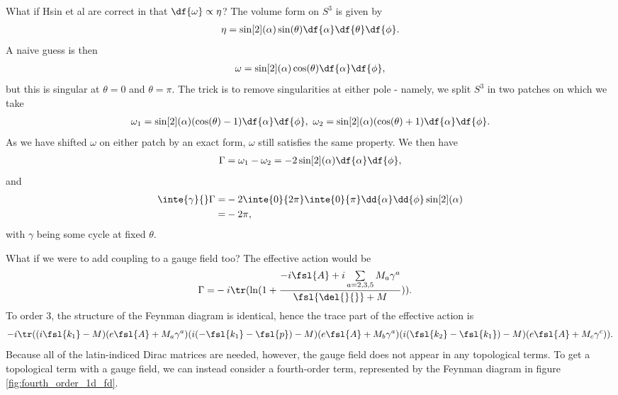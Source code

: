 What if Hsin et al are correct in that $\df{\omega} \propto \eta$? The volume form on $S^{3}$ is given by
\begin{align*}
	\eta = \sin[2](\alpha)\sin(\theta)\df{\alpha}\df{\theta}\df{\phi}.
\end{align*}
A naive guess is then
\begin{align*}
	\omega = \sin[2](\alpha)\cos(\theta)\df{\alpha}\df{\phi},
\end{align*}
but this is singular at $\theta = 0$ and $\theta = \pi$. The trick is to remove singularities at either pole - namely, we split $S^{3}$ in two patches on which we take
\begin{align*}
	\omega_{1} = \sin[2](\alpha)(\cos(\theta) - 1)\df{\alpha}\df{\phi},\ \omega_{2} = \sin[2](\alpha)(\cos(\theta) + 1)\df{\alpha}\df{\phi}.
\end{align*}
As we have shifted $\omega$ on either patch by an exact form, $\omega$ still satisfies the same property. We then have
\begin{align*}
	\Gamma = \omega_{1} - \omega_{2} = -2\sin[2](\alpha)\df{\alpha}\df{\phi},
\end{align*}
and
\begin{align*}
	\inte{\gamma}{}\Gamma =& -2\inte{0}{2\pi}\inte{0}{\pi}\dd{\alpha}\dd{\phi}\sin[2](\alpha) \\
	                      =& -2\pi,
\end{align*}
with $\gamma$ being some cycle at fixed $\theta$.

What if we were to add coupling to a gauge field too? The effective action would be
\begin{align*}
	\Gamma =& -i\tr(\ln(1 + \frac{-i\fsl{A} + i\sum\limits_{a = 2, 3, 5}M_{a}\gamma^{a}}{\fsl{\del{}{}} + M})).
\end{align*}
To order $3$, the structure of the Feynman diagram is identical, hence the trace part of the effective action is
\begin{align*}
	-i\tr((i\fsl{k_{1}} - M)(e\fsl{A} + M_{a}\gamma^{a})(i(-\fsl{k_{1}} - \fsl{p}) - M)(e\fsl{A} + M_{b}\gamma^{a})(i(\fsl{k_{2}} - \fsl{k_{1}}) - M)(e\fsl{A} + M_{c}\gamma^{c})).
\end{align*}
Because all of the latin-indiced Dirac matrices are needed, however, the gauge field does not appear in any topological terms. To get a topological term with a gauge field, we can instead consider a fourth-order term, represented by the Feynman diagram in figure \ref{fig:fourth_order_1d_fd}.

